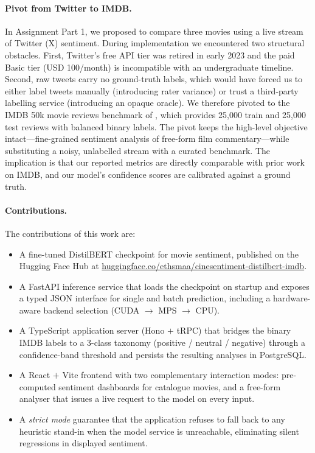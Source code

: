 \documentclass[11pt, a4paper]{article}
\begin{document}
\paragraph{Pivot from Twitter to IMDB.}
In Assignment Part 1, we proposed to compare three movies using a live stream of Twitter (X) sentiment. During implementation we encountered two structural obstacles. First, Twitter's free API tier was retired in early 2023 and the paid Basic tier (USD 100/month) is incompatible with an undergraduate timeline. Second, raw tweets carry no ground-truth labels, which would have forced us to either label tweets manually (introducing rater variance) or trust a third-party labelling service (introducing an opaque oracle). We therefore pivoted to the IMDB 50k movie reviews benchmark of \citet{maas2011learning}, which provides 25{,}000 train and 25{,}000 test reviews with balanced binary labels. The pivot keeps the high-level objective intact---fine-grained sentiment analysis of free-form film commentary---while substituting a noisy, unlabelled stream with a curated benchmark. The implication is that our reported metrics are directly comparable with prior work on IMDB, and our model's confidence scores are calibrated against a ground truth.

\paragraph{Contributions.}
The contributions of this work are:
\begin{itemize}[leftmargin=1.4em, itemsep=2pt, topsep=4pt]
  \item A fine-tuned DistilBERT checkpoint for movie sentiment, published on the Hugging Face Hub at \url{huggingface.co/ethsmaa/cinesentiment-distilbert-imdb}.
  \item A FastAPI inference service that loads the checkpoint on startup and exposes a typed JSON interface for single and batch prediction, including a hardware-aware backend selection (CUDA $\rightarrow$ MPS $\rightarrow$ CPU).
  \item A TypeScript application server (Hono $+$ tRPC) that bridges the binary IMDB labels to a 3-class taxonomy (positive / neutral / negative) through a confidence-band threshold and persists the resulting analyses in PostgreSQL.
  \item A React $+$ Vite frontend with two complementary interaction modes: pre-computed sentiment dashboards for catalogue movies, and a free-form analyser that issues a live request to the model on every input.
  \item A \emph{strict mode} guarantee that the application refuses to fall back to any heuristic stand-in when the model service is unreachable, eliminating silent regressions in displayed sentiment.
\end{itemize}
\end{document}
